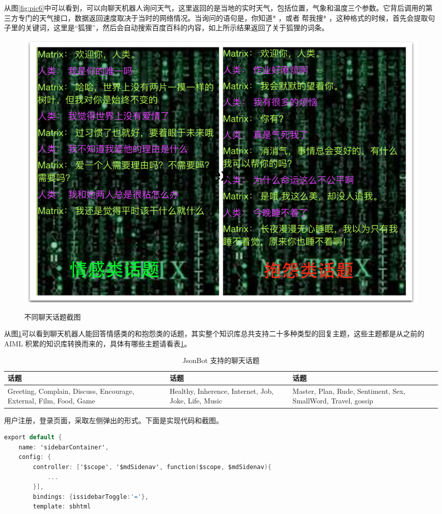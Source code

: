 \documentclass[bachelor,winfonts]{jnuthesis}
\begin{document}
从图\ref{fig:pic6}中可以看到，可以向聊天机器人询问天气，这里返回的是当地的实时天气，包括位置，气象和温度三个参数。它背后调用的第三方专门的天气接口，数据返回速度取决于当时的网络情况。当询问的语句是，你知道* ，或者 帮我搜* ，这种格式的时候，首先会提取句子里的关键词，这里是“狐狸”，然后会自动搜索百度百科的内容，如上所示结果返回了关于狐狸的词条。

\begin{figure}[H]
  \centering
  \includegraphics[width= 1.0\textwidth]{chattopic.png}\\
  \caption{不同聊天话题截图}\label{fig:pic7}
\end{figure}

从图\ref{fig:pic7}可以看到聊天机器人能回答情感类的和抱怨类的话题，其实整个知识库总共支持二十多种类型的回复主题，这些主题都是从之前的 AIML 积累的知识库转换而来的，具体有哪些主题请看表\ref{table:t3}。

\begin{table}[H]
  \centering
  \begin{tabular}{p{38mm}p{38mm}p{38mm}}
    \toprule
    \textbf{话题} & \textbf{话题} & \textbf{话题}\\
    \midrule
    Greeting, Complain, Discuss, Encourage, External, Film, Food, Game & Healthy, Inherence, Internet, Job, Joke, Life, Music & Master, Plan, Rude, Sentiment, Sex, SmallWord, Travel, gossip\\
    \bottomrule
  \end{tabular}
  \caption{JsonBot 支持的聊天话题}\label{table:t3}
\end{table}


用户注册，登录页面，采取左侧弹出的形式。下面是实现代码和截图。

\begin{lstlisting}[language=C]
export default {
	name: 'sidebarContainer', 
	config: {
		controller: ['$scope', '$mdSidenav', function($scope, $mdSidenav){
            ...
		}],
		bindings: {issidebarToggle:'='},
		template: sbhtml
\end{lstlisting}
\end{document}
